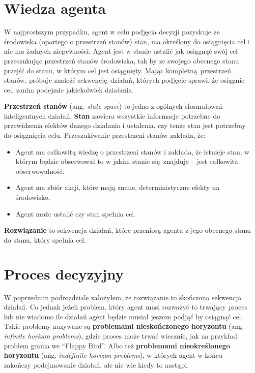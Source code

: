 \documentclass[a4paper, 12pt,oneside]{book}
\begin{document}
\section{Wiedza agenta} 
W najprostszym przypadku, agent w celu podjęcia decyzji pozyskuje ze środowiska
(opartego o przestrzeń stanów) stan, ma określony do osiągnięcia cel i nie ma
żadnych niepewności. Agent jest w stanie ustalić jak osiągnąć swój cel
przeszukując przestrzeń stanów środowiska, tak by ze swojego obecnego stanu
przejść do stanu, w którym cel jest osiągnięty. Mając kompletną przestrzeń
stanów, próbuje znaleźć sekwencję działań, których podjęcie sprawi, że osiągnie
cel, zanim podejmie jakiekolwiek działania.

\textbf{Przestrzeń stanów} (ang. \textit{state space}) to jedno z ogólnych
sformułowań inteligentnych działań. \textbf{Stan} zawiera wszystkie informacje
potrzebne do przewidzenia efektów danego działania i ustalenia, czy tenże stan
jest potrzebny do osiągnięcia celu. Przeszukiwanie przestrzeni stanów zakłada,
że:
\begin{itemize}
	\setlength\itemsep{-0.4em}
\item Agent ma całkowitą wiedzę o przestrzeni stanów i zakłada, że istnieje
	stan, w którym będzie obserwował to w jakim stanie się znajduje --
	jest całkowita obserwowalność.
\item Agent ma zbiór akcji, które mają znane, deterministyczne efekty na
	środowisko.
\item Agent może ustalić czy stan spełnia cel.
\end{itemize}
\textbf{Rozwiązanie} to sekwencja działań, które przeniosą agenta z jego
obecnego stanu do stanu, który spełnia cel.

\section{Proces decyzyjny}
W poprzednim podrozdziale założyłem, że rozwiązanie to skończona sekwencja
działań. Co jednak jeżeli problem, który agent musi rozważyć to trwający
proces lub nie wiadomo ile działań agent będzie musiał jeszcze podjąć by
osiągnąć cel. Takie problemy nazywane
są \textbf{problemami nieskończonego horyzontu} (ang. \textit{infinite horizon
problems}), gdzie proces może trwać wiecznie, jak na przykład problem grania
we ``Flappy Bird''. Albo też \textbf{problemami nieokreślonego horyzontu} (ang.
\textit{indefinite horizon problems}), w których agent w końcu zakończy
podejmowanie działań, ale nie wie kiedy to nastąpi.
\end{document}
